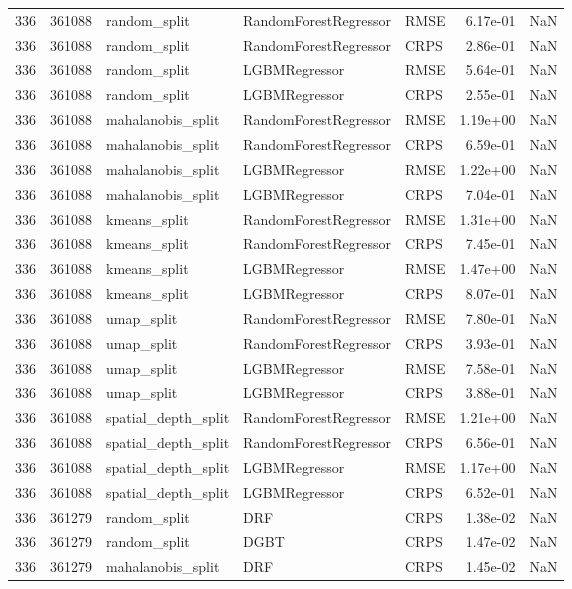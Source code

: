 \begin{tabular}{rrlllrr}
336 & 361088 & random\_split & RandomForestRegressor & RMSE & 6.17e-01 & NaN \\
336 & 361088 & random\_split & RandomForestRegressor & CRPS & 2.86e-01 & NaN \\
336 & 361088 & random\_split & LGBMRegressor & RMSE & 5.64e-01 & NaN \\
336 & 361088 & random\_split & LGBMRegressor & CRPS & 2.55e-01 & NaN \\
336 & 361088 & mahalanobis\_split & RandomForestRegressor & RMSE & 1.19e+00 & NaN \\
336 & 361088 & mahalanobis\_split & RandomForestRegressor & CRPS & 6.59e-01 & NaN \\
336 & 361088 & mahalanobis\_split & LGBMRegressor & RMSE & 1.22e+00 & NaN \\
336 & 361088 & mahalanobis\_split & LGBMRegressor & CRPS & 7.04e-01 & NaN \\
336 & 361088 & kmeans\_split & RandomForestRegressor & RMSE & 1.31e+00 & NaN \\
336 & 361088 & kmeans\_split & RandomForestRegressor & CRPS & 7.45e-01 & NaN \\
336 & 361088 & kmeans\_split & LGBMRegressor & RMSE & 1.47e+00 & NaN \\
336 & 361088 & kmeans\_split & LGBMRegressor & CRPS & 8.07e-01 & NaN \\
336 & 361088 & umap\_split & RandomForestRegressor & RMSE & 7.80e-01 & NaN \\
336 & 361088 & umap\_split & RandomForestRegressor & CRPS & 3.93e-01 & NaN \\
336 & 361088 & umap\_split & LGBMRegressor & RMSE & 7.58e-01 & NaN \\
336 & 361088 & umap\_split & LGBMRegressor & CRPS & 3.88e-01 & NaN \\
336 & 361088 & spatial\_depth\_split & RandomForestRegressor & RMSE & 1.21e+00 & NaN \\
336 & 361088 & spatial\_depth\_split & RandomForestRegressor & CRPS & 6.56e-01 & NaN \\
336 & 361088 & spatial\_depth\_split & LGBMRegressor & RMSE & 1.17e+00 & NaN \\
336 & 361088 & spatial\_depth\_split & LGBMRegressor & CRPS & 6.52e-01 & NaN \\
336 & 361279 & random\_split & DRF & CRPS & 1.38e-02 & NaN \\
336 & 361279 & random\_split & DGBT & CRPS & 1.47e-02 & NaN \\
336 & 361279 & mahalanobis\_split & DRF & CRPS & 1.45e-02 & NaN \\

\end{tabular}
